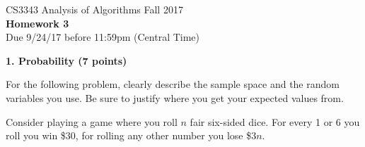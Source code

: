\documentclass[12pt]{elsart}
\begin{document}
\pagestyle{empty}

\begin{center}
\Large  CS3343 Analysis of Algorithms Fall 2017 \\
\large {\bf Homework 3}\\
\normalsize Due 9/24/17 before 11:59pm (Central Time)
\end{center}

{\bf 1.  Probability (7 points)}

For the following problem, clearly describe the sample space and the random variables you use.  Be sure to justify where you get your expected values from.

Consider playing a game where you roll $n$ fair six-sided dice.  For every 1 or 6 you roll you win \$30, for rolling any other number you lose \$$3 n$.
\end{document}
